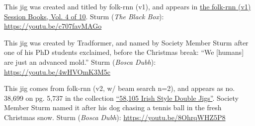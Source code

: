 \documentclass[a4paper,notitlepage,twoside]{book}
\begin{document}
{}
\hypertarget{jig:CunningStorm}{}
This jig was created and titled by folk-rnn (v1),
and appears in \href{https://highnoongmt.wordpress.com/2018/01/05/volumes-1-20-of-folk-rnn-v1-transcriptions}{the folk-rnn (v1) Session Books, Vol. 4 of 10}.
Sturm ({\em The Black Box}): \url{https://youtu.be/c707favMAGo}

{}
\hypertarget{jig:mold}{}
This jig was created by Tradformer, and named by Society Member Sturm
after one of his PhD students exclaimed, before the Christmas break:
``We [humans] are just an advanced mold.''
Sturm ({\em Bosca Dubh}): \url{https://youtu.be/4wHVOmK3M5c}

{}
\hypertarget{jig:chasingballs}{}
This jig comes from folk-rnn (v2, w/ beam search n=2),
and appears as no. 38,699 on pg. 5,737 in the collection
\href{http://urn.kb.se/resolve?urn=urn:nbn:se:kth:diva-296578}{``58,105 Irish Style Double Jigs''}.
Society Member Sturm named it after his dog chasing a tennis ball in the fresh Christmas snow.
Sturm ({\em Bosca Dubh}): \url{https://youtu.be/8OhrqWHZ5P8}



\clearpage
\end{document}
